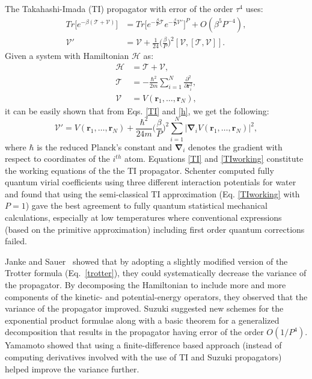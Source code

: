         The Takahashi-Imada (TI) propagator \cite{Takahashi1984} with error of the order $\tau^4$ uses:
        \begin{equation} \label{TI}
            \begin{aligned}
                Tr \Big[ e^{- \beta ( \mathcal{T} + \mathcal{V} )} \Big] &= Tr \Big[ e^{ -\frac{\beta}{P} \mathcal{T}} e^{-\frac{\beta}{P} \mathcal{V'}} \Big]^P + O (\beta^5 P^{-4}),\\
                \mathcal{V'} &= \mathcal{V} + \frac{1}{24} \bigg( \frac{\beta}{P} \bigg)^2 [\mathcal{V}, [\mathcal{T}, \mathcal{V}]].
            \end{aligned}
        \end{equation}
        Given a system with Hamiltonian $\mathcal{H}$ as:
        \begin{equation} \label{h}
            \begin{aligned}
                \mathcal{H} &= \mathcal{T} + \mathcal{V},\\
                \mathcal{T} &= -\displaystyle\frac{\hbar^2}{2m} \sum\limits_{i=1}^N \frac{\partial^2}{\partial \bm{r}_i^2},\\
                \mathcal{V} &= V (\bm{r}_1, \ldots , \bm{r}_N),
            \end{aligned}
        \end{equation}
        it can be easily shown that from Eqs. \eqref{TI} and \eqref{h}, we get the following:
        \begin{equation} \label{TIworking}
            \mathcal{V'} = V (\bm{r}_1, \ldots ,\bm{r}_N) + \frac{\hbar^2}{24m} \bigg(\frac{\beta}{P} \bigg)^2 \displaystyle\sum\limits_{i=1}^N \big|\pmb{\nabla}_i V (\bm{r}_1, \ldots ,\bm{r}_N) \big|^2,
        \end{equation}
        where $\hbar$ is the reduced Planck's constant and $\pmb{\nabla}_i$ denotes the gradient with respect to coordinates of the $i^{th}$ atom. Equations \eqref{TI} and \eqref{TIworking} constitute the working equations of the the TI propagator. Schenter \cite{Schenter2002} computed fully quantum virial coefficients using three different interaction potentials for water and found that using the semi-classical TI approximation (Eq. \eqref{TIworking} with $P = 1$) gave the best agreement to fully quantum statistical mechanical calculations, especially at low temperatures where conventional expressions (based on the primitive approximation) including first order quantum corrections failed.

        Janke and Sauer~\cite{Janke1992} showed that by adopting a slightly modified version of the Trotter formula (Eq.~\eqref{trotter}), they could systematically decrease the variance of the propagator. By decomposing the Hamiltonian to include more and more components of the kinetic- and potential-energy operators, they observed that the variance of the propagator improved.
        Suzuki \cite{Suzuki1995} suggested new schemes for the exponential product formulae along with a basic theorem for a generalized decomposition that results in the propagator having error of the order $O(1/P^4)$. Yamamoto \cite{Yamamoto2005} showed that using a finite-difference based approach (instead of computing derivatives involved with the use of TI and Suzuki propagators) helped improve the variance further.
